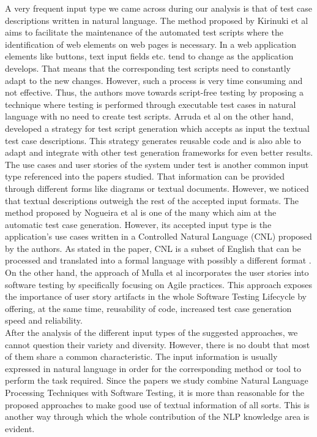 A very frequent input type we came across during our analysis is that of test case descriptions written in natural language. The method proposed 
by Kirinuki et al \cite{9609160} aims to facilitate the maintenance of the automated test scripts where the identification of web elements on 
web pages is necessary. In a web application elements like buttons, text input fields etc. tend to change as the application develops. That 
means that the corresponding test scripts need to constantly adapt to the new changes. However, such a process is very time consuming and 
not effective. Thus, the authors move towards script-free testing by proposing a technique where testing is performed through executable test 
cases in natural language with no need to create test scripts. Arruda et al \cite{arruda2020automation} on the other hand, developed a strategy 
for test script generation which accepts as input the textual test case descriptions. This strategy generates reusable code and is also able 
to adapt and integrate with other test generation frameworks for even better results.\\

The use cases and user stories of the system under test is another common input type referenced into the papers studied. That information can be provided through different forms like diagrams or 
textual documents. However, we noticed that textual descriptions outweigh the rest of the accepted input formats. The method proposed by Nogueira et al \cite{nogueira2015automatic} is one of the many which 
aim at the automatic test case generation. However, its accepted input type is the application's use cases written in a Controlled Natural Language (CNL) proposed by the authors. As stated in the paper, CNL 
is a subset of English that can be processed and translated into a formal language with possibly a different format \cite{nogueira2015automatic}. On the other hand, the approach of Mulla et al \cite{mulla2020potent} 
incorporates the user stories into software testing by specifically focusing on Agile practices. This approach exposes the importance of user story artifacts in the whole Software Testing Lifecycle by 
offering, at the same time, reusability of code, increased test case generation speed and reliability.\\

After the analysis of the different input types of the suggested approaches, we cannot question their variety and diversity. However, there is no doubt that most of them share a common characteristic. The input 
information is usually expressed in natural language in order for the corresponding method or tool to perform the task required. Since the papers we study combine Natural Language Processing Techniques with 
Software Testing, it is more than reasonable for the proposed approaches to make good use of textual information of all sorts. This is another way through which the whole contribution of the NLP knowledge area is evident.